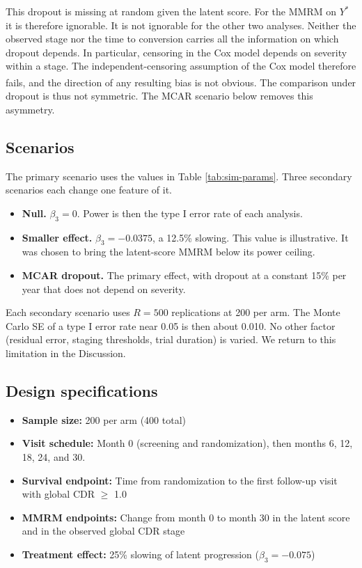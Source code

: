 \documentclass[
  11pt,
]{article}
\providecommand{\tightlist}{%
  \setlength{\itemsep}{0pt}\setlength{\parskip}{0pt}}
\begin{document}
This dropout is missing at random given the latent score.
For the MMRM on \(Y^*\) it is therefore ignorable. It is not
ignorable for the other two analyses. Neither the observed
stage nor the time to conversion carries all the
information on which dropout depends. In particular,
censoring in the Cox model depends on severity within a
stage. The independent-censoring assumption of the Cox
model therefore fails\textsuperscript{}, and
the direction of any resulting bias is not obvious. The
comparison under dropout is thus not symmetric. The MCAR
scenario below removes this asymmetry.

\subsection{Scenarios}\label{scenarios}

The primary scenario uses the values in Table
\ref{tab:sim-params}. Three secondary scenarios each
change one feature of it.

\begin{itemize}
\tightlist
\item
  \textbf{Null.} \(\beta_3 = 0\). Power is then the type I error
  rate of each analysis.
\item
  \textbf{Smaller effect.} \(\beta_3 = -0.0375\), a 12.5\% slowing.
  This value is illustrative. It was chosen to bring the
  latent-score MMRM below its power ceiling.
\item
  \textbf{MCAR dropout.} The primary effect, with dropout at a
  constant 15\% per year that does not depend on severity.
\end{itemize}

Each secondary scenario uses \(R = 500\) replications at
200 per arm. The Monte Carlo SE of a type I error rate
near 0.05 is then about 0.010. No other factor (residual
error, staging thresholds, trial duration) is varied. We
return to this limitation in the Discussion.

\subsection{Design specifications}\label{design-specifications}

\begin{itemize}
\tightlist
\item
  \textbf{Sample size:} 200 per arm (400 total)
\item
  \textbf{Visit schedule:} Month 0 (screening and
  randomization), then months 6, 12, 18, 24, and 30.
\item
  \textbf{Survival endpoint:} Time from randomization to the
  first follow-up visit with global CDR \(\geq\) 1.0
\item
  \textbf{MMRM endpoints:} Change from month 0 to month 30 in
  the latent score and in the observed global CDR stage
\item
  \textbf{Treatment effect:} 25\% slowing of latent progression
  (\(\beta_3 = -0.075\))
\end{itemize}
\end{document}
